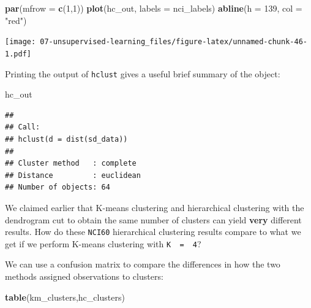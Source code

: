 \documentclass[openany]{book}
\newenvironment{Shaded}{\begin{snugshade}}{\end{snugshade}}
\newcommand{\DataTypeTok}[1]{\textcolor[rgb]{0.13,0.29,0.53}{#1}}
\newcommand{\DecValTok}[1]{\textcolor[rgb]{0.00,0.00,0.81}{#1}}
\newcommand{\KeywordTok}[1]{\textcolor[rgb]{0.13,0.29,0.53}{\textbf{#1}}}
\newcommand{\NormalTok}[1]{#1}
\newcommand{\OperatorTok}[1]{\textcolor[rgb]{0.81,0.36,0.00}{\textbf{#1}}}
\newcommand{\StringTok}[1]{\textcolor[rgb]{0.31,0.60,0.02}{#1}}
\begin{document}
\begin{Shaded}
\begin{Highlighting}[]
\KeywordTok{par}\NormalTok{(}\DataTypeTok{mfrow =} \KeywordTok{c}\NormalTok{(}\DecValTok{1}\NormalTok{,}\DecValTok{1}\NormalTok{))}
\KeywordTok{plot}\NormalTok{(hc_out, }\DataTypeTok{labels =}\NormalTok{ nci_labels)}
\KeywordTok{abline}\NormalTok{(}\DataTypeTok{h =} \DecValTok{139}\NormalTok{, }\DataTypeTok{col =} \StringTok{"red"}\NormalTok{)}
\end{Highlighting}
\end{Shaded}

\texttt{[image: 07-unsupervised-learning\_files/figure-latex/unnamed-chunk-46-1.pdf]}

Printing the output of \texttt{hclust} gives a useful brief summary of the object:

\begin{Shaded}
\begin{Highlighting}[]
\NormalTok{hc_out}
\end{Highlighting}
\end{Shaded}

\begin{verbatim}
## 
## Call:
## hclust(d = dist(sd_data))
## 
## Cluster method   : complete 
## Distance         : euclidean 
## Number of objects: 64
\end{verbatim}

We claimed earlier that K-means clustering and hierarchical
clustering with the dendrogram cut to obtain the same number
of clusters can yield \textbf{very} different results. How do these \texttt{NCI60} hierarchical
clustering results compare to what we get if we perform K-means clustering
with \texttt{K\ \ =\ \ 4}?

\begin{Shaded}
\end{Shaded}

We can use a confusion matrix to compare the differences in how the two methods assigned observations to clusters:

\begin{Shaded}
\begin{Highlighting}[]
\KeywordTok{table}\NormalTok{(km_clusters,hc_clusters)}
\end{Highlighting}
\end{Shaded}
\end{document}
